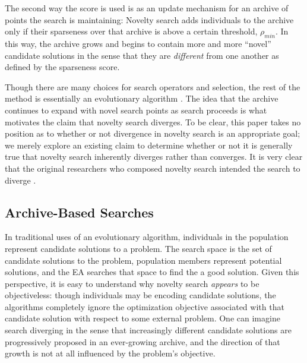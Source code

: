 \documentclass[twoside]{article}
\begin{document}
The second way the score is used is as an update mechanism for an archive of points the search is maintaining:  Novelty search adds individuals to the archive only if their sparseness over that archive is above a certain threshold, $\rho_{min}$.  In this way, the archive grows and begins to contain more and more ``novel'' candidate solutions in the sense that they are \emph{different} from one another as defined by the sparseness score.

Though there are many choices for search operators and selection, the rest of the method is essentially an evolutionary algorithm \citep{ec:DeJong2006}.  The idea that the archive continues to expand with novel search points as search proceeds is what motivates the claim that novelty search diverges.  To be clear, this paper takes no position as to whether or not divergence in novelty search is an appropriate goal; we merely explore an existing claim to determine whether or not it is generally true that novelty search inherently diverges rather than converges.  It is very clear that the original researchers who composed novelty search intended the search to diverge \citep{Lehman2016frai,Lehman2015gecco,StanleyLehman2015}.


\subsection{Archive-Based Searches}
\label{subsec:archive}

In traditional uses of an evolutionary algorithm, individuals in the population represent candidate solutions to a problem.  The search space is the set of candidate solutions to the problem, population members represent potential solutions, and the EA searches that space to find the a good solution.  Given this perspective, it is easy to understand why novelty search \emph{appears} to be objectiveless:  though individuals may be encoding candidate solutions, the algorithms completely ignore the optimization objective associated with that candidate solution with respect to some external problem.  One can imagine search diverging in the sense that increasingly different candidate solutions are progressively proposed in an ever-growing archive, and the direction of that growth is not at all influenced by the problem's objective.  
\end{document}
